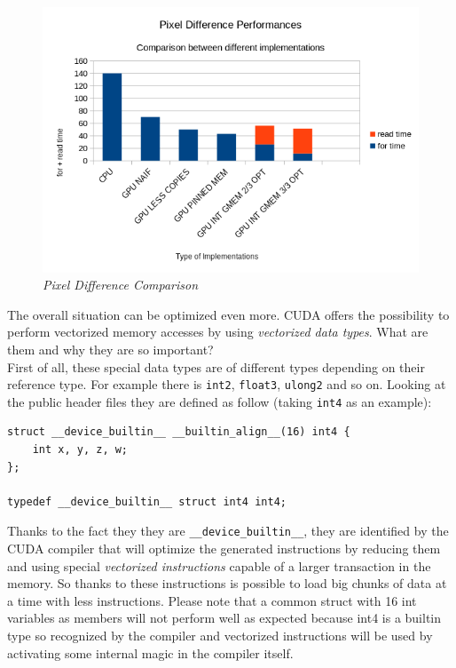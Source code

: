 \documentclass[paper=a4, fontsize=10pt]{scrartcl}	%
\begin{document}
	\begin{figure}[H]
		\centering
		\includegraphics[width=0.8\linewidth]{images/chart5.png}
		\caption{\textit{Pixel Difference Comparison}}
		\label{fig:chart5}
	\end{figure}

	The overall situation can be optimized even more. CUDA offers the possibility to perform vectorized memory accesses by using \textit{vectorized data types}. What are them and why they are so important?\\

	First of all, these special data types are of different types depending on their reference type. For example there is \texttt{int2}, \texttt{float3}, \texttt{ulong2} and so on. Looking at the public header files they are defined as follow (taking \texttt{int4} as an example):

	\begin{lstlisting}[style=CStyle]
struct __device_builtin__ __builtin_align__(16) int4 {
    int x, y, z, w;
};

typedef __device_builtin__ struct int4 int4;\end{lstlisting}

	Thanks to the fact they they are \texttt{\_\_device\_builtin\_\_}, they are identified by the CUDA compiler that will optimize the generated instructions by reducing them and using special \textit{vectorized instructions} capable of a larger transaction in the memory. So thanks to these instructions is possible to load big chunks of data at a time with less instructions. Please note that a common struct with 16 int variables as members will not perform well as expected because int4 is a builtin type so recognized by the compiler and vectorized instructions will be used by activating some internal magic in the compiler itself.\\
\end{document}

